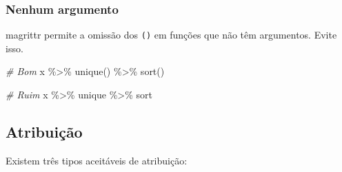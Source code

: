\documentclass[
]{book}
\newenvironment{Shaded}{\begin{snugshade}}{\end{snugshade}}
\newcommand{\CommentTok}[1]{\textcolor[rgb]{0.56,0.35,0.01}{\textit{#1}}}
\newcommand{\FunctionTok}[1]{\textcolor[rgb]{0.00,0.00,0.00}{#1}}
\newcommand{\NormalTok}[1]{#1}
\newcommand{\SpecialCharTok}[1]{\textcolor[rgb]{0.00,0.00,0.00}{#1}}
\begin{document}
\hypertarget{nenhum-argumento}{%
\subsubsection{Nenhum argumento}\label{nenhum-argumento}}

magrittr permite a omissão dos \texttt{()} em funções que não têm argumentos. Evite
isso.

\begin{Shaded}
\begin{Highlighting}[]
\CommentTok{\# Bom}
\NormalTok{x }\SpecialCharTok{\%\textgreater{}\%} 
  \FunctionTok{unique}\NormalTok{() }\SpecialCharTok{\%\textgreater{}\%}
  \FunctionTok{sort}\NormalTok{()}

\CommentTok{\# Ruim}
\NormalTok{x }\SpecialCharTok{\%\textgreater{}\%} 
\NormalTok{  unique }\SpecialCharTok{\%\textgreater{}\%}
\NormalTok{  sort}
\end{Highlighting}
\end{Shaded}

\hypertarget{atribuiuxe7uxe3o}{%
\subsection{Atribuição}\label{atribuiuxe7uxe3o}}

Existem três tipos aceitáveis de atribuição:
\end{document}
